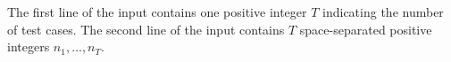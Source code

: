 The first line of the input contains one positive integer $T$ indicating
the number of test cases.
The second line of the input contains $T$ space-separated positive integers 
$n_1,\dots,n_T$.
